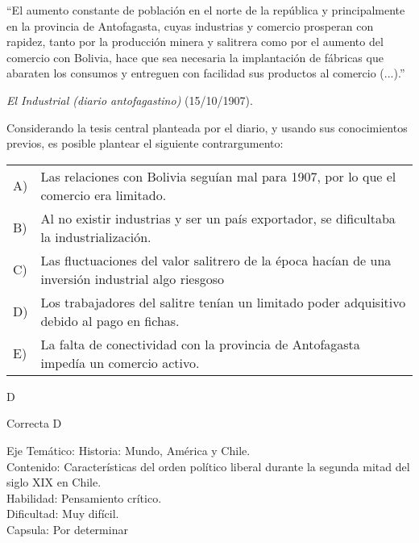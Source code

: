 \documentclass[letterpaper,11pt]{article}
\newcommand{\anchopregunta}{0.9\textwidth}
\begin{document}
\begin{enumerate}
\begin{minipage}{\anchopregunta}
\item ``El aumento constante de población en el norte de la república y principalmente en la provincia de Antofagasta, cuyas industrias y comercio prosperan con rapidez, tanto por la producción minera y salitrera como por el aumento del comercio con Bolivia, hace que sea necesaria la implantación de fábricas que abaraten los consumos y entreguen con facilidad sus productos al comercio (...).''
\begin{flushright}
\textit{El Industrial (diario antofagastino)} (15/10/1907).
\end{flushright}
Considerando la tesis central planteada por el diario, y usando sus conocimientos previos, es posible plantear el siguiente contrargumento:
\begin{flushleft}\begin{tabular}{@{\hspace{-.001\textwidth}}l@{\hspace{2pt}}p{}}
A)& Las relaciones con Bolivia seguían mal para 1907, por lo que el comercio era limitado.\\
B)& Al no existir industrias y ser un país exportador, se  dificultaba la industrialización.\\
C)& Las fluctuaciones del valor salitrero  de la época hacían de una inversión industrial algo riesgoso\\
D)& Los trabajadores del salitre tenían un limitado poder adquisitivo debido al pago en fichas.\\
E)& La falta de conectividad con la provincia de Antofagasta impedía un comercio activo.\\ 
\end{tabular}\end{flushleft}%
\begin{key} D
\end{key} 
\begin{hint}
\end{hint}
\begin{answer} Correcta D \\
\end{answer}
\begin{info} %
\begin{flushleft}
Eje Temático: Historia: Mundo, América y Chile.\\
Contenido: Características del orden político liberal durante la segunda mitad del siglo XIX en Chile.\\
Habilidad: Pensamiento crítico.\\
Dificultad: Muy difícil.\\
Capsula: Por determinar \\
\end{flushleft} 
\end{info}
\end{minipage}\vfill$\;$ %


\end{enumerate}
\end{document}
